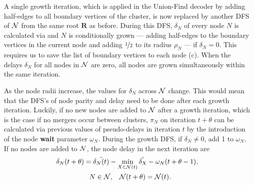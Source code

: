 A single growth iteration, which is applied in the Union-Find decoder by adding half-edges to all boundary vertices of the cluster, is now replaced by another DFS of $\mathcal{N}$ from the same root $\mathbf{R}$ as before. During this DFS, $\delta_N$ of every node $N$ is calculated via  and $N$ is conditionally grown --- adding half-edges to the boundary vertices in the current node and adding $\nicefrac{1}{2}$ to its radius $\rho_N$ --- if $\delta_N = 0$. This requires us to save the list of boundary vertices to each node (c). When the delays $\delta_N$ for all nodes in $\mathcal{N}$ are zero, all nodes are grown simultaneously within the same iteration. 

As the node radii increase, the values for $\delta_N$ across $\mathcal{N}$ change. This would mean that the DFS's of node parity and delay need to be done after each growth iteration. Luckily, if no new nodes are added to $\mathcal{N}$ after a growth iteration, which is the case if no mergers occur between clusters, $\pi_N$ on iteration $t+\theta$ can be calculated via previous values of pseudo-delays in iteration $t$ by the introduction of the node \textbf{wait} parameter $\omega_N$. During the growth DFS, if $\delta_N \neq 0$, add 1 to $\omega_N$. If no nodes are added to $\mathcal{N}$, the node delay in the next iteration are
\begin{multline}\label{eq:delay}
    \delta_N(t+\theta) = \tilde{\delta_N(t)} - \min_{X \in \mathcal{N}(t)}{\tilde{\delta_X}} - \omega_N(t+\theta-1),  \\
    \hspace{.3cm} N \in \mathcal{N}, \hspace{.3cm} \mathcal{N}(t+\theta) = \mathcal{N}(t).  
\end{multline}


